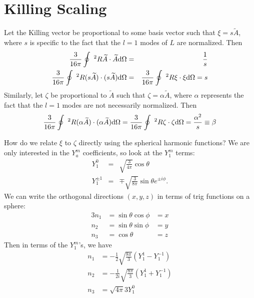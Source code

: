 \documentclass[11pt]{article}
\begin{document}
\section{Killing Scaling}
Let the Killing vector be proportional to some basis vector such that $\xi = s \widetilde{A}$, where $s$ is specific to the fact that the $l=1$ modes of $L$ are normalized.  Then
\begin{eqnarray}
\frac{3}{16 \pi} \oint ~^2R \widetilde{A} \cdot \widetilde{A} {\rm d \Omega} &=& \frac{1}{s} \\
\frac{3}{16 \pi} \oint ~^2R (s \widetilde{A}) \cdot (s \widetilde{A}) {\rm d \Omega} &=& 
\frac{3}{16 \pi} \oint ~^2R \xi \cdot \xi {\rm d \Omega} = s 
\end{eqnarray}
Similarly, let $\zeta$ be proportional to $\widetilde{A}$ such that $\zeta = \alpha \widetilde{A}$, where $\alpha$ represents the fact that the $l=1$ modes are not necessarily normalized.  Then
\begin{equation}
\frac{3}{16 \pi} \oint ~^2R (\alpha \widetilde{A}) \cdot (\alpha \widetilde{A}) {\rm d \Omega} = 
\frac{3}{16 \pi} \oint ~^2R \zeta \cdot \zeta {\rm d \Omega} = \frac{\alpha^2}{s} \equiv \beta
\end{equation}

\noindent
How do we relate $\xi$ to $\zeta$ directly using the spherical harmonic functions?  We are only interested in the $Y_a^m$ coefficients, so look at the $Y_1^m$ terms:
\begin{eqnarray}
Y_1^0 &=& \sqrt{\frac{3}{4 \pi}} \cos \theta \\
Y_1^{\pm 1} &=& \mp \sqrt{\frac{3}{8 \pi}} \sin \theta e^{\pm i \phi}.
\end{eqnarray}
We can write the orthogonal directions $(x,y,z)$ in terms of trig functions on a sphere:
\begin{alignat}{3}
n_1 &= \sin \theta \cos \phi &= {x} \\
n_2 &= \sin \theta \sin \phi &= {y}\\
n_3 &= \cos \theta &= {z}
\end{alignat}
Then in terms of the $Y_1^m$'s, we have
\begin{equation}
\begin{split}
\label{n-Y}
n_1 &= -\frac{1}{2} \sqrt{\frac{8 \pi}{3}} \left( Y_1^1 - Y_1^{-1} \right) \\
n_2 &= -\frac{1}{2i} \sqrt{\frac{8 \pi}{3}} \left( Y_1^1 + Y_1^{-1} \right) \\
n_3 &= \sqrt{4 \pi}{3}  Y_1^0
\end{split}
\end{equation}
\end{document}
